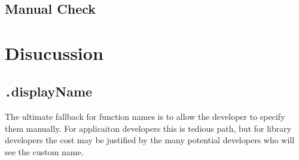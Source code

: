 \documentclass[10pt, preprint]{sigplanconf}
\begin{document}
\begin{table}
\centering
{}
 \label{firebug} 
\caption{Number of similar, and different function names in comparison to Firebug {\small \texttt{guessFunctionName()}}.}
\end{table}    

\subsection{Manual Check}



\section{Disucussion}

\subsection{ {\texttt .displayName} }
The ultimate fallback for function names is to allow the developer to specify them manually. For applicaiton developers this is tedious path, but for library developers the cost may be justified by the many potential developers who will see the custom name.
\end{document}
